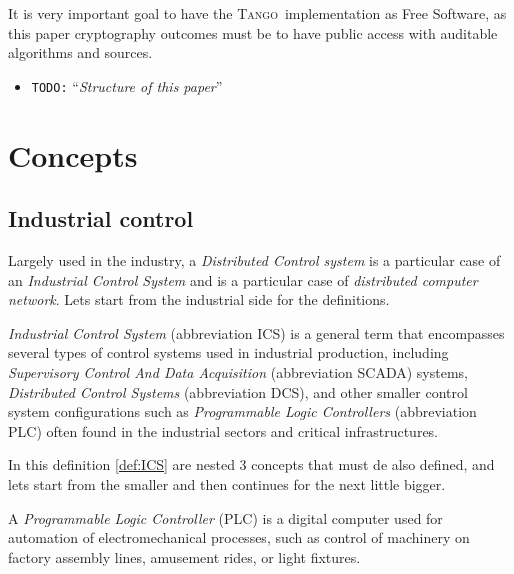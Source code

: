 \documentclass[10pt,a4paper,twoside]{llncs}
\newcommand{\todo}[1]{\texttt{\color{red}TODO:} ``\emph{#1}''}
\newcommand{\tango}{\textsc{Tango}}
\begin{document}
It is very important goal to have the \tango\, implementation as Free Software, as this paper cryptography outcomes must be to have public access with auditable algorithms and sources.

\begin{itemize}
    \item \todo{Structure of this paper}
\end{itemize}


\section{Concepts}\label{sec:concepts}

\subsection{Industrial control}\label{sec:IndCtrl}

Largely used in the industry, a \emph{Distributed Control system} is a particular case of an \emph{Industrial Control System} and is a particular case of \emph{distributed computer network}. Lets start from the industrial side for the definitions.

\begin{definition}\label{def:ICS}
    \emph{Industrial Control System} (abbreviation ICS) is a general term that encompasses several types of control systems used in industrial production, including \emph{Supervisory Control And Data Acquisition} (abbreviation SCADA) systems, \emph{Distributed Control Systems} (abbreviation DCS), and other smaller control system configurations such as \emph{Programmable Logic Controllers} (abbreviation PLC) often found in the industrial sectors and critical infrastructures.
\end{definition}

In this definition \ref{def:ICS} are nested 3 concepts that must de also defined, and lets start from the smaller and then continues for the next little bigger.

\begin{definition}\label{def:PLC}
    A \emph{Programmable Logic Controller} (PLC) is a digital computer used for automation of electromechanical processes, such as control of machinery on factory assembly lines, amusement rides, or light fixtures.
\end{definition}
\end{document}
